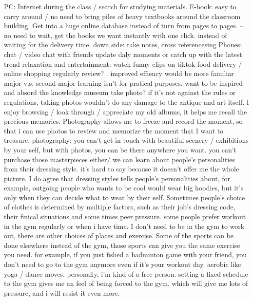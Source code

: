 \documentclass{ctexart}
\begin{document}
\begin{outline}
        \2 PC: Internet during the class / search for studying materials.
        \2 E-book: easy to carry around / no need to bring piles of heavy textbooks around the classroom building. Get into a huge online database instead of turn from pages to pages. -- no need to wait, get the books we want instantly with one click. instead of waiting for the delivery time.
            \3 down side: take notes, cross referencesing
        \2 Phones:
            \3 chat / video chat with friends
            \3 update daly moments or catch up with the latest trend
            \3 relaxation and entertainment: watch funny clips on tiktok
            \3 food delivery / online shopping
    \1 regularly review?
        . improved effiency
            \3 would be more familiar
            \3 major v.s. second major 
        \2 learning isn't for pratical purposes.
            \3 want to be inspired and absord the knowledge
            \3 
    \1 museum take photo?
        \2 if it's not against the rules or regulations, taking photos wouldn't do any damage to the antique and art itself.
        \2 I enjoy browsing / look through / appreciate my old albums, it helps me recall the precious memories. Photography allows me to freeze and record the moment, so that i can use photos to review and memorize the moment that I want to treasure.
            \3 photography: you can't get in touch with beautiful scenery / exhibitions by your self, but with photos, you can be there anywhere you want.
            \3 you can't purchase those masterpieces either/
    \1 we can learn about people's personalities from their dressing style.
        \2 it's hard to say because it doesn't offer me the whole picture. I do agree that dressing styles tells people's personalities about, for example, outgoing people who wants to be cool would wear big hoodies, but it's only when they can decide what to wear by their self. Sometimes people's choice of clothes is determined by multiple factors, such as their job's dressing code, their finical situations and some times peer pressure.
    \1 some people prefer workout in the gym regularly or when i have time.
        \2 I don't need to be in the gym to work out, there are other choices of places and exercise.
            \3 Some of the sports can be done elsewhere instead of the gym, those sports can give you the same exercise you need. for example, if you just fished a badminton game with your friend, you don't need to go to the gym anymore even if it's your workout day. aerobic like yoga / dance moves.
        \2 personally, i'm kind of a free person. setting a fixed schedule to the gym gives me an feel of being forced to the gym, which will give me lots of pressure, and i will resist it even more.

\end{outline}
\end{document}

